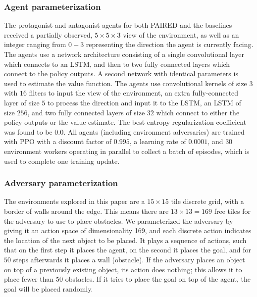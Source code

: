 \documentclass{article}
\begin{document}
\begin{appendix}
\subsubsection{Agent parameterization}
The protagonist and antagonist agents for both PAIRED and the baselines received a partially observed, $5\times5\times3$ view of the environment, as well as an integer ranging from $0-3$ representing the direction the agent is currently facing. The agents use a network architecture consisting of a single convolutional layer which connects to an LSTM, and then to two fully connected layers which connect to the policy outputs. A second network with identical parameters is used to estimate the value function. The agents use convolutional kernels of size $3$ with $16$ filters to input the view of the environment, an extra fully-connected layer of size $5$ to process the direction and input it to the LSTM, an LSTM of size $256$, and two fully connected layers of size $32$ which connect to either the policy outputs or the value estimate. The best entropy regularization coefficient was found to be $0.0$. All agents (including environment adversaries) are trained with PPO with a discount factor of $0.995$, a learning rate of $0.0001$, and $30$ environment workers operating in parallel to collect a batch of episodes, which is used to complete one training update.


\subsubsection{Adversary parameterization}
The environments explored in this paper are a $15\times15$ tile discrete grid, with a border of walls around the edge. This means there are $13\times13=169$ free tiles for the adversary to use to place obstacles. We parameterized the adversary by giving it an action space of dimensionality 169, and each discrete action indicates the location of the next object to be placed. It plays a sequence of actions, such that on the first step it places the agent, on the second it places the goal, and for $50$ steps afterwards it places a wall (obstacle). If the adversary places an object on top of a previously existing object, its action does nothing; this allows it to place fewer than $50$ obstacles. If it tries to place the goal on top of the agent, the goal will be placed randomly.


\end{appendix}
\end{document}
